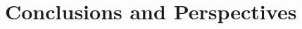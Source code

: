 \documentclass[professionalfonts,aspectratio=169]{beamer}
\begin{document}

\section{Conclusions and Perspectives}
\end{document}
